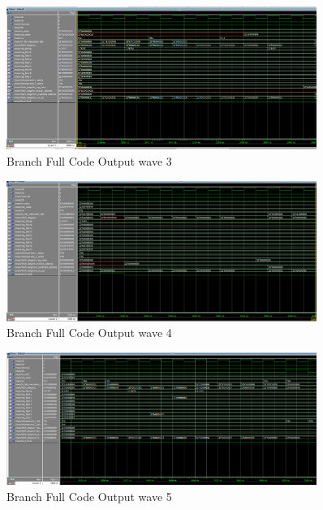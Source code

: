 \begin{figure}[H]
    \centering
    \includegraphics[width=0.9\textwidth]{images/test_cases/branch/Branch_regular_3.PNG}
    \caption{Branch Full Code Output wave 3}
    \label{fig:br_reg_3}
\end{figure}

\begin{figure}[H]
    \centering
    \includegraphics[width=0.9\textwidth]{images/test_cases/branch/Branch_regular_4.PNG}
    \caption{Branch Full Code Output wave 4}
    \label{fig:br_reg_4}
\end{figure}

\begin{figure}[H]
    \centering
    \includegraphics[width=0.9\textwidth]{images/test_cases/branch/Branch_regular_5.PNG}
    \caption{Branch Full Code Output wave 5}
    \label{fig:br_reg_5}
\end{figure}

